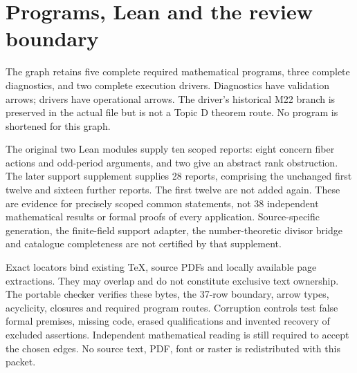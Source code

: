 \documentclass[a4paper,11pt]{article}
\begin{document}
\section*{Programs, Lean and the review boundary}
The graph retains five complete required mathematical programs, three
complete diagnostics, and two complete execution drivers. Diagnostics have
validation arrows; drivers have operational arrows. The driver's historical
M22 branch is preserved in the actual file but is not a Topic D theorem
route. No program is shortened for this graph.

The original two Lean modules supply ten scoped reports: eight concern
fiber actions and odd-period arguments, and two give an abstract rank
obstruction. The later support supplement supplies 28 reports, comprising
the unchanged first twelve and sixteen further reports. The first twelve
are not added again. These are evidence for precisely scoped common
statements, not 38 independent mathematical results or formal proofs of
every application. Source-specific generation, the finite-field support
adapter, the number-theoretic divisor bridge and catalogue completeness
are not certified by that supplement.

Exact locators bind existing TeX, source PDFs and locally available page
extractions. They may overlap and do not constitute exclusive text ownership.
The portable checker verifies these bytes, the 37-row boundary, arrow types,
acyclicity, closures and required program routes. Corruption controls test
false formal premises, missing code, erased qualifications and invented
recovery of excluded assertions. Independent mathematical reading is still
required to accept the chosen edges. No source text, PDF, font or raster is
redistributed with this packet.
\end{document}
